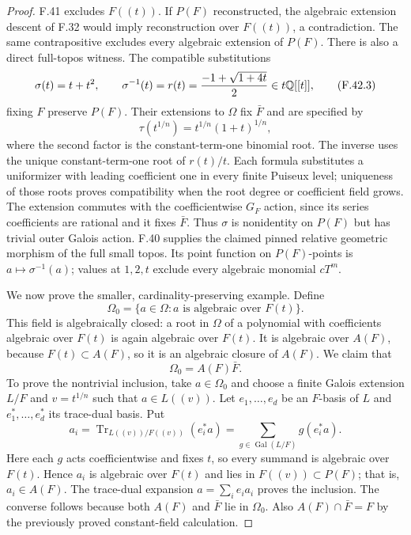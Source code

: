 \begin{proof}
F.41 excludes $F((t))$. If $P(F)$ reconstructed, the algebraic
extension descent of F.32 would imply reconstruction over
$F((t))$, a contradiction. The same contrapositive excludes
every algebraic extension of $P(F)$.
There is also a direct full-topos witness. The compatible
substitutions
\[
 \sigma(t)=t+t^2,\qquad
 \sigma^{-1}(t)=r(t)=\frac{-1+\sqrt{1+4t}}2\in t\mathbb Q[[t]],
                                                               \tag{F.42.3}
\]
fixing $F$ preserve $P(F)$. Their extensions to $\Omega$
fix $\bar F$ and are specified by
\[
       \tau(t^{1/n})=t^{1/n}(1+t)^{1/n},                       \tag{F.42.4}
\]
where the second factor is the constant-term-one binomial
root. The inverse uses the unique constant-term-one root
of $r(t)/t$. Each formula substitutes a uniformizer with
leading coefficient one in every finite Puiseux level;
uniqueness of those roots proves compatibility when the
root degree or coefficient field grows. The extension
commutes with the coefficientwise $G_F$ action, since its
series coefficients are rational and it fixes $\bar F$.
Thus $\sigma$ is nonidentity on $P(F)$ but has trivial outer
Galois action. F.40 supplies the claimed pinned relative
geometric morphism of the full small topos. Its point function
on $P(F)$-points is $a\mapsto\sigma^{-1}(a)$; values at
$1,2,t$ exclude every algebraic monomial $cT^m$.

We now prove the smaller, cardinality-preserving example.
Define
\[
 \Omega_0=\{a\in\Omega:a\text{ is algebraic over }F(t)\}.
\]
This field is algebraically closed: a root in $\Omega$ of a
polynomial with coefficients algebraic over $F(t)$ is again
algebraic over $F(t)$. It is algebraic over $A(F)$, because
$F(t)\subset A(F)$, so it is an algebraic closure of $A(F)$.
We claim that
\[
                         \Omega_0=A(F)\bar F.                \tag{F.42.5}
\]
To prove the nontrivial inclusion, take $a\in\Omega_0$ and
choose a finite Galois extension $L/F$ and $v=t^{1/n}$ such
that $a\in L((v))$. Let $e_1,\ldots,e_d$ be an $F$-basis
of $L$ and $e_1^*,\ldots,e_d^*$ its trace-dual basis. Put
\[
 a_i=\operatorname{Tr}_{L((v))/F((v))}(e_i^*a)
     =\sum_{g\in\operatorname{Gal}(L/F)}g(e_i^*a).
\]
Here each $g$ acts coefficientwise and fixes $t$, so every
summand is algebraic over $F(t)$. Hence $a_i$ is algebraic
over $F(t)$ and lies in $F((v))\subset P(F)$; that is,
$a_i\in A(F)$. The trace-dual expansion $a=\sum_i e_i a_i$
proves the inclusion. The converse follows because both
$A(F)$ and $\bar F$ lie in $\Omega_0$.
Also $A(F)\cap\bar F=F$ by the previously proved constant-field
calculation.


\end{proof}
